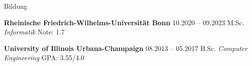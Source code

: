 \begin{rubric}{Bildung}


\entry*[] \textbf{Rheinische Friedrich-Wilhelms-Universität Bonn} \hfill 10.2020 -- 09.2023  \newline
  M.Sc. \emph{Informatik}  \hfill Note:  1.7 %

\entry*[] \textbf{University of Illinois Urbana-Champaign} \hfill 08.2013 -- 05.2017  \newline
 B.Sc. \emph{Computer Engineering} \hfill GPA: 3.55/4.0 \newline %



\end{rubric}